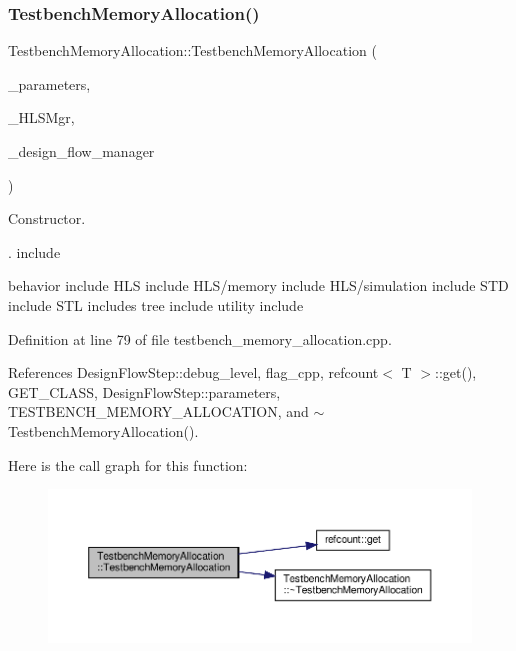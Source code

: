 \subsubsection{\texorpdfstring{Testbench\+Memory\+Allocation()}{TestbenchMemoryAllocation()}}
{\footnotesize\ttfamily Testbench\+Memory\+Allocation\+::\+Testbench\+Memory\+Allocation (\begin{DoxyParamCaption}\item[{const \hyperlink{Parameter_8hpp_a37841774a6fcb479b597fdf8955eb4ea}{Parameter\+Const\+Ref}}]{\+\_\+parameters,  }\item[{const \hyperlink{hls__manager_8hpp_acd3842b8589fe52c08fc0b2fcc813bfe}{H\+L\+S\+\_\+manager\+Ref}}]{\+\_\+\+H\+L\+S\+Mgr,  }\item[{const Design\+Flow\+Manager\+Const\+Ref}]{\+\_\+design\+\_\+flow\+\_\+manager }\end{DoxyParamCaption})}



Constructor. 

. include

behavior include H\+LS include H\+L\+S/memory include H\+L\+S/simulation include S\+TD include S\+TL includes tree include utility include 

Definition at line 79 of file testbench\+\_\+memory\+\_\+allocation.\+cpp.



References Design\+Flow\+Step\+::debug\+\_\+level, flag\+\_\+cpp, refcount$<$ T $>$\+::get(), G\+E\+T\+\_\+\+C\+L\+A\+SS, Design\+Flow\+Step\+::parameters, T\+E\+S\+T\+B\+E\+N\+C\+H\+\_\+\+M\+E\+M\+O\+R\+Y\+\_\+\+A\+L\+L\+O\+C\+A\+T\+I\+ON, and $\sim$\+Testbench\+Memory\+Allocation().

Here is the call graph for this function\+:
\nopagebreak
\begin{figure}[H]
\begin{center}
\leavevmode
\includegraphics[width=350pt]{dc/d25/classTestbenchMemoryAllocation_ac8c474eff29721aced9a039fa2b162bd_cgraph}
\end{center}
\end{figure}
\mbox{\label{classTestbenchMemoryAllocation_af738ba6ce2b3d84c1ab6be279faafdb5}} 
